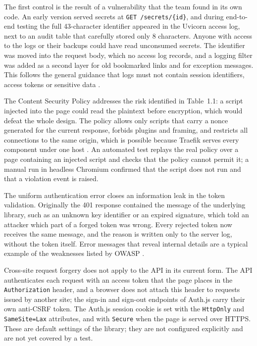 \documentclass[12pt,a4paper]{article}
\numberwithin{equation}{section}
\numberwithin{figure}{section}
\numberwithin{table}{section}
\begin{document}
The first control is the result of a vulnerability that the team found in its own code. An early version served secrets at \texttt{GET /secrets/\{id\}}, and during end-to-end testing the full 43-character identifier appeared in the Uvicorn access log, next to an audit table that carefully stored only 8 characters. Anyone with access to the logs or their backups could have read unconsumed secrets. The identifier was moved into the request body, which no access log records, and a logging filter was added as a second layer for old bookmarked links and for exception messages. This follows the general guidance that logs must not contain session identifiers, access tokens or sensitive data \cite{owasplogging}.

The Content Security Policy addresses the risk identified in Table~1.1: a script injected into the page could read the plaintext before encryption, which would defeat the whole design. The policy allows only scripts that carry a nonce generated for the current response, forbids plugins and framing, and restricts all connections to the same origin, which is possible because Traefik serves every component under one host \cite{csp3}. An automated test replays the real policy over a page containing an injected script and checks that the policy cannot permit it; a manual run in headless Chromium confirmed that the script does not run and that a violation event is raised.

The uniform authentication error closes an information leak in the token validation. Originally the 401 response contained the message of the underlying library, such as an unknown key identifier or an expired signature, which told an attacker which part of a forged token was wrong. Every rejected token now receives the same message, and the reason is written only to the server log, without the token itself. Error messages that reveal internal details are a typical example of the weaknesses listed by OWASP \cite{owasptop10}.

Cross-site request forgery does not apply to the API in its current form. The API authenticates each request with an access token that the page places in the \texttt{Authorization} header, and a browser does not attach this header to requests issued by another site; the sign-in and sign-out endpoints of Auth.js carry their own anti-CSRF token. The Auth.js session cookie is set with the \texttt{HttpOnly} and \texttt{SameSite=Lax} attributes, and with \texttt{Secure} when the page is served over HTTPS. These are default settings of the library; they are not configured explicitly and are not yet covered by a test.
\end{document}
